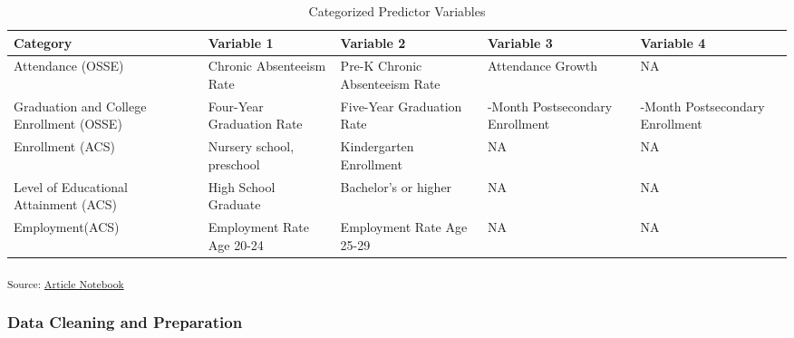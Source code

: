 \documentclass[
  letterpaper,
  DIV=11,
  numbers=noendperiod]{scrartcl}
\begin{document}
\begin{longtable}[]{@{}
  >{\raggedright\arraybackslash}p{}
  >{\raggedright\arraybackslash}p{}
  >{\raggedright\arraybackslash}p{}
  >{\raggedright\arraybackslash}p{}
  >{\raggedright\arraybackslash}p{}@{}}

\caption{\label{tbl-predictor-categories}Categorized Predictor
Variables}

\tabularnewline

\toprule\noalign{}
\begin{minipage}[b]{\linewidth}\raggedright
Category
\end{minipage} & \begin{minipage}[b]{\linewidth}\raggedright
Variable 1
\end{minipage} & \begin{minipage}[b]{\linewidth}\raggedright
Variable 2
\end{minipage} & \begin{minipage}[b]{\linewidth}\raggedright
Variable 3
\end{minipage} & \begin{minipage}[b]{\linewidth}\raggedright
Variable 4
\end{minipage} \\
\midrule\noalign{}
\endhead
\bottomrule\noalign{}
\endlastfoot
Attendance (OSSE) & Chronic Absenteeism Rate & Pre-K Chronic Absenteeism
Rate & Attendance Growth & NA \\
Graduation and College Enrollment (OSSE) & Four-Year Graduation Rate &
Five-Year Graduation Rate & 6-Month Postsecondary Enrollment & 12-Month
Postsecondary Enrollment \\
Enrollment (ACS) & Nursery school, preschool & Kindergarten Enrollment &
NA & NA \\
Level of Educational Attainment (ACS) & High School Graduate &
Bachelor's or higher & NA & NA \\
Employment(ACS) & Employment Rate Age 20-24 & Employment Rate Age 25-29
& NA & NA \\

\end{longtable}

\textsubscript{Source:
\href{https://sds-capstone.github.io/dced-f26/index.qmd.html}{Article
Notebook}}

\subsubsection{Data Cleaning and
Preparation}\label{data-cleaning-and-preparation}
\end{document}
